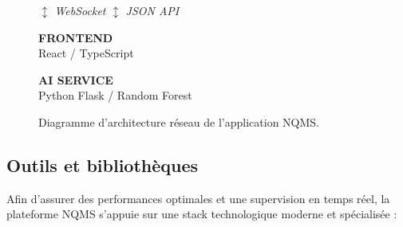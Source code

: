 \documentclass[11pt,a4paper]{article}
\begin{document}
\begin{figure}[H]
\begin{tcolorbox}[
    colback=bg-slate, colframe=slate-navy, boxrule=1.5pt, arc=6pt,
    title={\textbf{Diagramme d'architecture réseau -- Système NQMS}},
    fonttitle=\bfseries\color{white}, coltitle=white
]
\vspace{0.05cm}
\begin{minipage}{0.5\textwidth}\centering
{\footnotesize $\updownarrow$ \textit{WebSocket}} \hspace{0.5cm} {\footnotesize $\updownarrow$ \textit{JSON API}}
\end{minipage}
\vspace{0.05cm}

\begin{minipage}{0.5\textwidth}
\centering
\begin{tcolorbox}[colback=white, colframe=slate-navy, boxrule=1.5pt, arc=4pt]
    \centering
    {\small\bfseries\color{slate-navy} FRONTEND} \\
    {\footnotesize\color{text-slate} React / TypeScript}
\end{tcolorbox}
\end{minipage}%
\hfill
\begin{minipage}{0.45\textwidth}
\centering
\begin{tcolorbox}[colback=white, colframe=teal-accent, boxrule=1pt, arc=4pt]
    \centering
    {\small\bfseries\color{teal-accent} AI SERVICE} \\
    {\footnotesize\color{text-slate} Python Flask / Random Forest}
\end{tcolorbox}
\end{minipage}

\vspace{0.3cm}
\end{tcolorbox}
\caption{Diagramme d'architecture réseau de l'application NQMS.}
\end{figure}

\subsection{Outils et bibliothèques}

Afin d'assurer des performances optimales et une supervision en temps réel, la plateforme NQMS s'appuie sur une stack technologique moderne et spécialisée :
\end{document}
